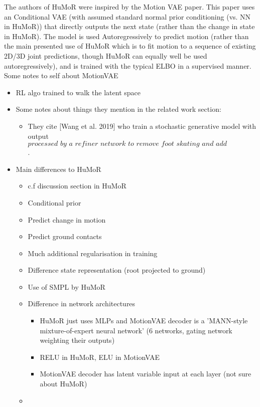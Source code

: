 The authors of HuMoR \cite{humor} were inspired by the Motion VAE \cite{MotionVAE} paper. This paper uses an Conditional VAE (with assumed standard normal prior conditioning (vs. NN in HuMoR)) that directly outputs the next state (rather than the change in state in HuMoR). The model is used Autoregressively to predict motion (rather than the main presented use of HuMoR which is to fit motion to a sequence of existing 2D/3D joint predictions, though HuMoR can equally well be used autoregressively), and is trained with the typical ELBO in a supervised manner. \\
Some notes to self about MotionVAE
\begin{itemize}
    \item RL algo trained to walk the latent space
    \item Some notes about things they mention in the related work section:
    \begin{itemize}
        \item They cite [Wang et al. 2019] who train a stochastic generative model with output $\textit{processed by a refiner network to remove foot skating and add robustness}$.
    \end{itemize}
    \item Main differences to HuMoR
    \begin{itemize}
        \item c.f discussion section in HuMoR
        \item Conditional prior
        \item Predict change in motion
        \item Predict ground contacts
        \item Much additional regularisation in training
        \item Difference state representation (root projected to ground)
        \item Use of SMPL by HuMoR
        \item Difference in network architectures
        \begin{itemize}
            \item HuMoR just uses MLPs and MotionVAE decoder is a 'MANN-style mixture-of-expert neural network' (6 networks, gating network weighting their outputs)
            \item RELU in HuMoR, ELU in MotionVAE
            \item MotionVAE decoder has latent variable input at each layer (not sure about HuMoR)
        \end{itemize}
        \item 
    \end{itemize}
\end{itemize}

